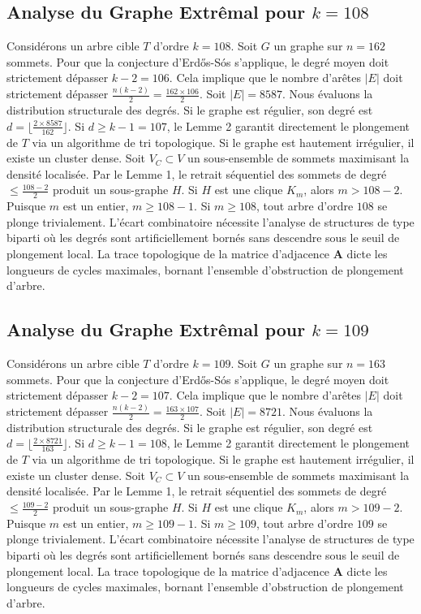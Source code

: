 \documentclass[11pt,a4paper]{article}
\begin{document}
\subsection{Analyse du Graphe Extr\^emal pour $k=108$}
Consid\'erons un arbre cible $T$ d'ordre $k=108$.
Soit $G$ un graphe sur $n=162$ sommets.
Pour que la conjecture d'Erd\H{o}s-S\'os s'applique, le degr\'e moyen doit strictement d\'epasser $k-2 = 106$.
Cela implique que le nombre d'ar\^etes $|E|$ doit strictement d\'epasser $\frac{n(k-2)}{2} = \frac{162 \times 106}{2}$.
Soit $|E| = 8587$.
Nous \'evaluons la distribution structurale des degr\'es. Si le graphe est r\'egulier, son degr\'e est $d = \lfloor \frac{2 \times 8587}{162} \rfloor$.
Si $d \geq k-1 = 107$, le Lemme 2 garantit directement le plongement de $T$ via un algorithme de tri topologique.
Si le graphe est hautement irr\'egulier, il existe un cluster dense. Soit $V_C \subset V$ un sous-ensemble de sommets maximisant la densit\'e localis\'ee.
Par le Lemme 1, le retrait s\'equentiel des sommets de degr\'e $\leq \frac{108-2}{2}$ produit un sous-graphe $H$.
Si $H$ est une clique $K_{m}$, alors $m > 108-2$. Puisque $m$ est un entier, $m \geq 108-1$. Si $m \geq 108$, tout arbre d'ordre $108$ se plonge trivialement.
L'\'ecart combinatoire n\'ecessite l'analyse de structures de type biparti o\`u les degr\'es sont artificiellement born\'es sans descendre sous le seuil de plongement local. La trace topologique de la matrice d'adjacence $\mathbf{A}$ dicte les longueurs de cycles maximales, bornant l'ensemble d'obstruction de plongement d'arbre.


\subsection{Analyse du Graphe Extr\^emal pour $k=109$}
Consid\'erons un arbre cible $T$ d'ordre $k=109$.
Soit $G$ un graphe sur $n=163$ sommets.
Pour que la conjecture d'Erd\H{o}s-S\'os s'applique, le degr\'e moyen doit strictement d\'epasser $k-2 = 107$.
Cela implique que le nombre d'ar\^etes $|E|$ doit strictement d\'epasser $\frac{n(k-2)}{2} = \frac{163 \times 107}{2}$.
Soit $|E| = 8721$.
Nous \'evaluons la distribution structurale des degr\'es. Si le graphe est r\'egulier, son degr\'e est $d = \lfloor \frac{2 \times 8721}{163} \rfloor$.
Si $d \geq k-1 = 108$, le Lemme 2 garantit directement le plongement de $T$ via un algorithme de tri topologique.
Si le graphe est hautement irr\'egulier, il existe un cluster dense. Soit $V_C \subset V$ un sous-ensemble de sommets maximisant la densit\'e localis\'ee.
Par le Lemme 1, le retrait s\'equentiel des sommets de degr\'e $\leq \frac{109-2}{2}$ produit un sous-graphe $H$.
Si $H$ est une clique $K_{m}$, alors $m > 109-2$. Puisque $m$ est un entier, $m \geq 109-1$. Si $m \geq 109$, tout arbre d'ordre $109$ se plonge trivialement.
L'\'ecart combinatoire n\'ecessite l'analyse de structures de type biparti o\`u les degr\'es sont artificiellement born\'es sans descendre sous le seuil de plongement local. La trace topologique de la matrice d'adjacence $\mathbf{A}$ dicte les longueurs de cycles maximales, bornant l'ensemble d'obstruction de plongement d'arbre.
\end{document}
